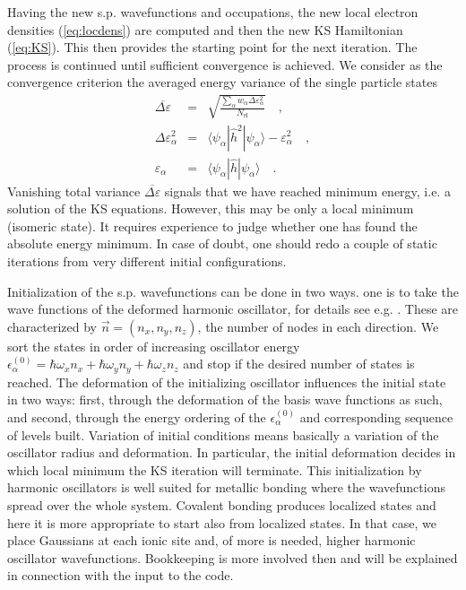 \documentclass[final,1p]{elsarticle}
\begin{document}
Having the new s.p. wavefunctions and occupations, the new local
electron densities (\ref{eq:locdens}) are computed and then the new KS
Hamiltonian (\ref{eq:KS}). This then provides the starting point for
the next iteration. The process is continued until sufficient
convergence is achieved. We consider as the convergence criterion the
averaged energy variance of the single particle states
\begin{subequations}
  \label{eq:totvar}
  \begin{eqnarray}
    \overline{\Delta\varepsilon}
    &=&
    \sqrt{\frac{\sum_\alpha w_\alpha\Delta\varepsilon_\alpha^2}
         {N_\mathrm{el}}}
    \quad,
    \\
    \Delta\varepsilon_\alpha^2
    &=&
    \langle\psi_\alpha|\hat{h}^2|\psi_\alpha\rangle
    -
    \varepsilon_\alpha^2
    \quad,
    \label{eq:spvar}
    \\
    \varepsilon_\alpha
    &=&
    \langle\psi_\alpha|\hat{h}|\psi_\alpha\rangle
    \quad.
    \label{eq:spenerg}
  \end{eqnarray}
\end{subequations}
Vanishing total variance $\overline{\Delta\varepsilon}$ signals that
we have reached minimum energy, i.e. a solution of the KS
equations. However, this may be only a local minimum (isomeric
state). It requires experience to judge whether one has found the
absolute energy minimum. In case of doubt, one should redo a couple of
static iterations from very different initial configurations.

Initialization of the s.p. wavefunctions can be done in two ways.  one
is to take the wave functions of the deformed harmonic oscillator, for
details see e.g. \cite{Mar10aB} . These are characterized by
$\vec{n}=(n_x,n_y,n_z)$, the number of nodes in each direction. We
sort the states in order of increasing oscillator energy
$\epsilon_\alpha^{(0)}=\hbar\omega_xn_x+\hbar\omega_yn_y+\hbar\omega_zn_z$
and stop if the desired number of states is reached. The deformation
of the initializing oscillator influences the initial state in two
ways: first, through the deformation of the basis wave functions as
such, and second, through the energy ordering of the
$\epsilon_\alpha^{(0)}$ and corresponding sequence of levels
built. Variation of initial conditions means basically a variation of
the oscillator radius and deformation. In particular, the initial
deformation decides in which local minimum the KS iteration will
terminate. This initialization by harmonic oscillators is well suited
for metallic bonding where the wavefunctions spread over the whole
system. Covalent bonding produces localized states and here it is more
appropriate to start also from localized states. In that case, we
place Gaussians at each ionic site and, of more is needed, higher
harmonic oscillator wavefunctions. Bookkeeping is more involved then
and will be explained in connection with the input to the code.
\end{document}
